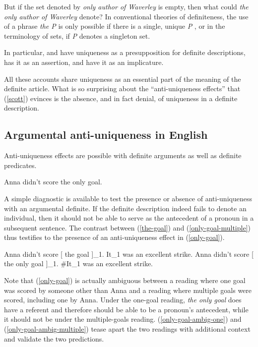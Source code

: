 But if the set denoted by \textit{only author of Waverley} is empty, then what could \textit{the only author of Waverley} denote? In conventional theories of definiteness, the use of a phrase \textit{the P} is only possible if there is a single, unique \textit{P} \citep{horn-abbott-2012}, or in the terminology of sets, if \textit{P} denotes a singleton set.

In particular, \citet{frege} and \citet{strawson50} have uniqueness as a presupposition for definite descriptions, \citet{russell} has it as an assertion, and \citet{horn-abbott-2012} have it as an implicature.

All these accounts share uniqueness as an essential part of the meaning of the definite article. What is so surprising about the ``anti-uniqueness effects'' that (\ref{scott}) evinces is the absence, and in fact denial, of uniqueness in a definite description.

\subsection{Argumental anti-uniqueness in English}
Anti-uniqueness effects are possible with definite arguments as well as definite predicates.

\begin{exe}
	\ex \label{only-goal} Anna didn't score the only goal.
\end{exe}

A simple diagnostic is available to test the presence or absence of anti-uniqueness with an argumental definite. If the definite description indeed fails to denote an individual, then it should not be able to serve as the antecedent of a pronoun in a subsequent sentence. The contrast between (\ref{the-goal}) and (\ref{only-goal-multiple}) thus testifies to the presence of an anti-uniqueness effect in (\ref{only-goal}).

\begin{exe}
	\ex \label{the-goal} Anna didn't score [ the goal ]_1. It_1 was an excellent strike.
	\ex \label{only-goal-multiple} Anna didn't score [ the only goal ]_1. \#It_1 was an excellent strike.
\end{exe}

Note that (\ref{only-goal}) is actually ambiguous between a reading where one goal was scored by someone other than Anna and a reading where multiple goals were scored, including one by Anna. Under the one-goal reading, \textit{the only goal} does have a referent and therefore should be able to be a pronoun's antecedent, while it should not be under the multiple-goals reading. (\ref{only-goal-ambig-one}) and (\ref{only-goal-ambig-multiple}) tease apart the two readings with additional context and validate the two predictions.

